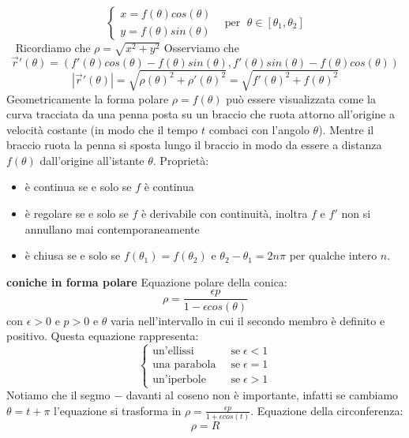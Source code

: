 \[
    \begin{cases}
        x = f(\theta) cos(\theta)\\
        y = f(\theta) sin(\theta)
    \end{cases} \;\;\; \text{per } \; \theta \in [\theta_1, \theta_2]
\]
\ \newline
Ricordiamo che $\rho = \sqrt{x^2 + y^2}$
Osserviamo che 
\[
    \vec{r}'(\theta) = (f'(\theta) cos(\theta)- f(\theta)sin(\theta), f'(\theta) sin(\theta) - f(\theta)cos(\theta))
\]
\[
    |\vec{r}'(\theta)| = \sqrt{\rho(\theta)^2 + \rho'(\theta)^2} = \sqrt{f'(\theta)^2 + f(\theta)^2}
\]
Geometricamente la forma polare $\rho = f(\theta)$ può essere visualizzata come la curva tracciata da una penna posta su un braccio che ruota attorno all'origine a velocità costante (in modo che il tempo $t$ combaci con l'angolo $\theta$). Mentre il braccio ruota la penna si sposta lungo il braccio in modo da essere a distanza $f(\theta)$ dall'origine all'istante $\theta$.\newline
\newline
Proprietà:
\begin{itemize}
    \item è continua se e solo se $f$ è continua
    \item è regolare se e solo se $f$ è derivabile con continuità, inoltra $f$ e $f'$ non si annullano mai contemporaneamente
    \item è chiusa se e solo se $f(\theta_1) = f(\theta_2)$ e $\theta_2 - \theta_1 = 2n\pi$ per qualche intero $n$.
\end{itemize}
\textbf{coniche in forma polare}\newline
Equazione polare della conica:
\[
        \rho = \frac{\epsilon p}{1- \epsilon cos(\theta)}
\]
con $\epsilon > 0$ e $p> 0$ e $\theta$ varia nell'intervallo in cui il secondo membro è definito e positivo.\newline
Questa equazione rappresenta:
\[
    \begin{cases}
        \text{un'ellissi} \;\; &\text{se} \; \epsilon< 1\\
        \text{una parabola} \;\; &\text{se} \; \epsilon= 1\\
        \text{un'iperbole} \;\; &\text{se} \; \epsilon> 1
    \end{cases}
\]
Notiamo che il segmo $-$ davanti al coseno non è importante, infatti se cambiamo $\theta = t + \pi$ l'equazione si trasforma in $\rho = \frac{\epsilon p}{1 + \epsilon cos(t)}$.\newline
Equazione della circonferenza:
\[
        \rho = R
\]
